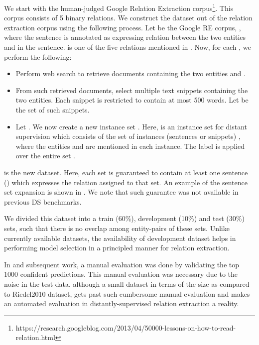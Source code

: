 \documentclass{article}
\begin{document}
We start with the human-judged Google Relation Extraction corpus\footnote{https://research.googleblog.com/2013/04/50000-lessons-on-how-to-read-relation.html}. This corpus consists of 5 binary relations. We construct the \newdatasetshort{} dataset out of the relation extraction corpus using the following process. Let  be the Google RE corpus,  , where the  sentence  is annotated as expressing relation  between the two entities  and  in the sentence.  is one of the five relations mentioned in . Now, for each , we perform the following:

\begin{itemize}
  \item Perform web search to retrieve documents containing the two entities  and .
  \item From such retrieved documents, select multiple text snippets containing the two entities. Each snippet is restricted to contain at most 500 words. Let  be the set of such snippets.
  \item Let . We now create a new instance set . Here,  is an instance set for distant supervision which consists of the set of instances (sentences or snippets) , where the entities  and  are mentioned in each instance. The label  is applied over the entire set .
\end{itemize}

 is the new \newdatasetshort{} dataset. Here, each set  is guaranteed to contain at least one sentence () which expresses the relation  assigned to that set. An example of the sentence set expansion is shown in .   We note that such guarantee was not available in previous DS benchmarks.

We divided this dataset into a train (60\%), development (10\%) and test (30\%) sets, such that there is no overlap among entity-pairs of these sets. Unlike currently available datasets, the availability of development dataset helps in performing model selection in a principled manner for relation extraction. 

In \cite{riedel:2010} and subsequent work, a manual evaluation was done by validating the top 1000 confident predictions. This manual evaluation was necessary due to the noise in the test data. \newdatasetshort{} although a small dataset in terms of the size as compared to Riedel2010 dataset, gets past such cumbersome manual evaluation and makes an automated evaluation in distantly-supervised relation extraction a reality.
 
\end{document}
